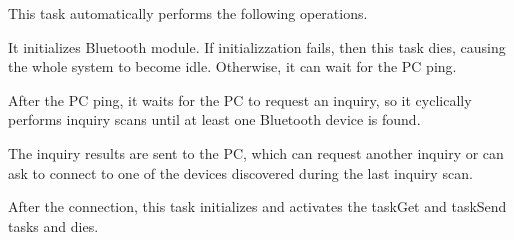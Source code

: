 \documentclass[paper=a4, fontsize=11pt]{scrartcl} %
\numberwithin{equation}{section} %
\numberwithin{figure}{section} %
\numberwithin{table}{section} %
\begin{document}
This task automatically performs the following operations.

It initializes Bluetooth module. If initializzation fails, then this task dies, causing the whole system to become idle. Otherwise, it can wait for the PC ping.

After the PC ping, it waits for the PC to request an inquiry, so it cyclically performs inquiry scans until at least one Bluetooth device is found.

The inquiry results are sent to the PC, which can request another inquiry or can ask to connect to one of the devices discovered during the last inquiry scan.

After the connection, this task initializes and activates the taskGet and taskSend tasks and dies.
\end{document}
